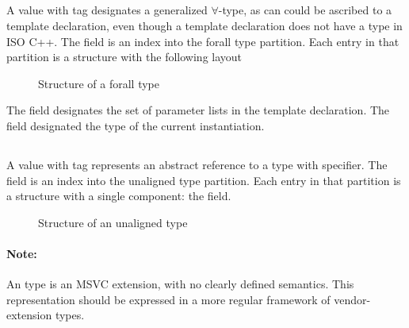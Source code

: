 
\subsection{}
\label{sec:ifc:TypeSort:Forall}

A  value with tag  designates a generalized $\forall$-type,
as can could be ascribed to a template declaration, even though a template declaration does not have a type in ISO C++. 
The  field is an index into the forall type partition.
Each entry in that partition is a structure with the following layout
%
\begin{figure}[H]
	\centering
	\caption{Structure of a forall type}
	\label{fig:ifc-forall-type-structure}
\end{figure}
%
The  field designates the set of parameter lists in the template declaration.
The  field designated the type of the current instantiation.




\subsection{}
\label{sec:ifc:TypeSort:Unaligned}

A  value with tag  represents
an abstract reference to a type with  specifier.
The  field is an index into the unaligned type partition.
Each entry in that partition is a structure with a single component: the  field.
%
\begin{figure}[H]
	\centering
	\caption{Structure of an unaligned type}
	\label{fig:ifc-unaligned-type-structure}
\end{figure}
%


\paragraph{Note:} An  type is an MSVC extension, with no
clearly defined semantics.  This representation should be expressed in a more
regular framework of vendor-extension types.


